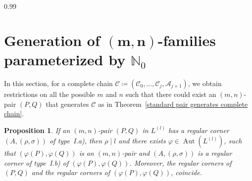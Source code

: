 \documentclass[reqno,a4paper,twoside]{amsart}
\newtheorem{proposition}[theorem]{Proposition}
\theoremstyle{definition}
\theoremstyle{remark}
\DeclareMathOperator{\Aut}{Aut}
\begin{document}
\begin{spacing}{0.99}
\section[Generation of $(m,n)$-families parameterized by $\mathds{N}_0$]{Generation of $\bm{(m,n)}$-families parameterized by $\mathds{N}_0$}

In this section, for a complete chain $\mathscr{C}\coloneqq (\mathcal{C}_0,\dots,\mathcal{C}_j,\mathcal{A}_{j+1})$, we obtain restrictions on all the possible $m$ and $n$ such that there could exist an $(m,n)$-pair $(P,Q)$ that generates $\mathscr{C}$ as in Theo\-rem~\ref{standard pair generates complete chain}.

\begin{proposition}\label{modif final}
If an $(m,n)$-pair $(P,Q)$ in $L^{(l)}$ has a regular corner $(A,(\rho,\sigma))$ of type~I.a), then $\rho\mid l$ and there exists $\varphi\in\Aut(L^{(l)})$, such that $(\varphi(P),\varphi(Q))$ is an $(m,n)$-pair and $(A,(\rho,\sigma))$ is a regular corner of type~I.b) of $(\varphi(P),\varphi(Q))$. Moreover, the regular corners of $(P,Q)$ and the regular corners of $(\varphi(P),\varphi(Q))$, coincide.
\end{proposition}


\end{spacing}
\end{document}
